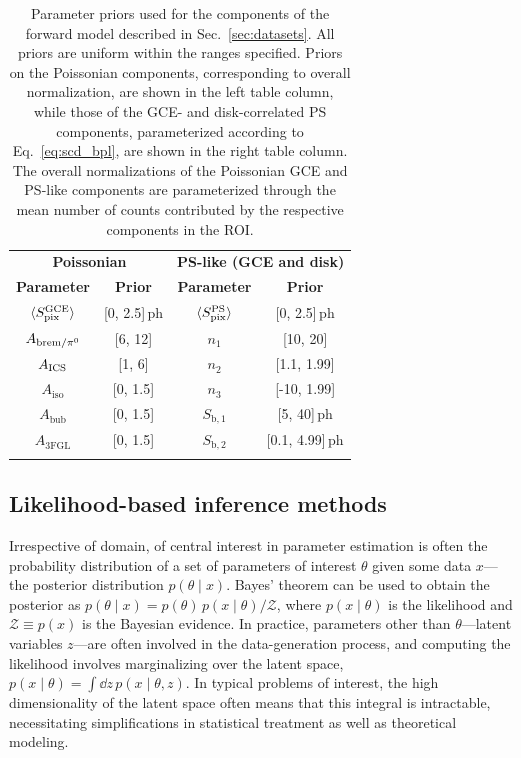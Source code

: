 \documentclass[prd,aps,10pt,nofootinbib,twocolumn,superscriptaddress,preprintnumbers,balancelastpage,longbibliography]{revtex4-1}
\newcommand\Tstrut{\rule{0pt}{2.6ex}}         %
\newcommand\Bstrut{\rule[-0.9ex]{0pt}{0pt}}   %
\begin{document}
\begin{table}[tb]
\footnotesize
\begin{center}
\begin{tabular}{cc|cc}
\toprule
\multicolumn{2}{c}{\textbf{Poissonian}} & \multicolumn{2}{c}{\textbf{PS-like (GCE and disk)}}\Tstrut\Bstrut	\\   
\Xhline{1\arrayrulewidth}
\textbf{Parameter}	 & \textbf{Prior}  & \textbf{Parameter}	&  \textbf{Prior}\Tstrut\Bstrut	\\   
\Xhline{1\arrayrulewidth}
$\langle S_{\rm pix}^{\rm GCE} \rangle$ & [0, 2.5]\,ph  & $\langle S_{\rm pix}^{\rm PS} \rangle$ & [0, 2.5]\,ph\Tstrut\Bstrut \\
$A_{{\rm brem}/\pi^0}$ & [6, 12]  &  $n_1$ & [10, 20]\Tstrut\Bstrut  \\ 
$A_{\rm ICS}$  & [1, 6]  & $n_2$ & [1.1, 1.99]\Tstrut\Bstrut  \\ 
$A_\text{iso}$ & [0, 1.5] &  $n_3$ & [-10, 1.99]\Tstrut\Bstrut \\
$A_\text{bub}$ & [0, 1.5] &  $S_{\mathrm b,1}$ & [5, 40]\,ph\Tstrut\Bstrut \\
$A_\text{3FGL}$ & [0, 1.5] & $S_{\mathrm b,2}$  & [0.1, 4.99]\,ph\Tstrut\Bstrut \\
\botrule
\end{tabular}
\end{center}
\caption{Parameter priors used for the components of the forward model described in Sec.~\ref{sec:datasets}. All priors are uniform within the ranges specified. Priors on the Poissonian components, corresponding to overall normalization, are shown in the left table column, while those of the GCE- and disk-correlated PS components, parameterized according to Eq.~\eqref{eq:scd_bpl}, are shown in the right table column. The overall normalizations of the Poissonian GCE and PS-like components are parameterized through the mean number of counts contributed by the respective components in the ROI.}
\label{tab:priors}
\end{table}  

\subsection{Likelihood-based inference methods}
\label{sec:likelihood-methods}

Irrespective of domain, of central interest in parameter estimation is often the probability distribution of a set of parameters of interest $\theta$ given some data $x$---the posterior distribution $p(\theta\mid x)$. Bayes' theorem can be used to obtain the posterior as $p(\theta\mid x) = p(\theta)\, p(x\mid\theta) / \mathcal Z$, where $p(x\mid\theta)$ is the likelihood and $\mathcal Z \equiv p(x)$ is the Bayesian evidence. In practice, parameters other than $\theta$---latent variables $z$---are often involved in the data-generation process, and computing the likelihood involves marginalizing over the latent space, $p(x\mid\theta) = \int \dd z\,p(x\mid\theta, z)$. In typical problems of interest, the high dimensionality of the latent space often means that this integral is intractable, necessitating simplifications in statistical treatment as well as theoretical modeling. 
\end{document}
